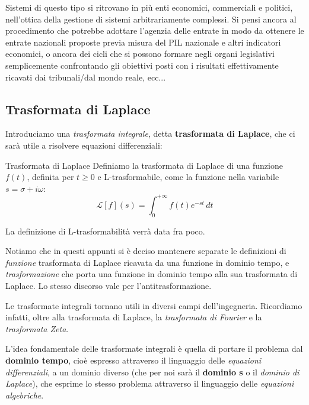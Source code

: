 \documentclass[a4paper,11pt]{article}
\begin{document}
\begin{itemize}
		Sistemi di questo tipo si ritrovano in più enti economici, commerciali e politici, nell'ottica della gestione di sistemi arbitrariamente complessi. Si pensi ancora al procedimento che potrebbe adottare l'agenzia delle entrate in modo da ottenere le entrate nazionali proposte previa misura del PIL nazionale e altri indicatori economici, o ancora dei cicli che si possono formare negli organi legislativi semplicemente confrontando gli obiettivi posti con i risultati effettivamente ricavati dai tribunali/dal mondo reale, ecc...
\end{itemize}

\subsection{Trasformata di Laplace}
Introduciamo una \textit{trasformata integrale}, detta \textbf{trasformata di Laplace}, che ci sarà utile a risolvere equazioni differenziali:
\begin{definition}{Trasformata di Laplace}
	Definiamo la trasformata di Laplace di una funzione $f(t)$, definita per $t \geq 0$ e L-trasformabile, come la funzione nella variabile $s = \sigma + i \omega$:
	$$
	\mathcal{L} [f] (s) = \int_{0}^{+\infty} f(t) e^{-st} \, dt
	$$
\end{definition}

La definizione di L-trasformabilità verrà data fra poco.

\par\smallskip

Notiamo che in questi appunti si è deciso mantenere separate le definizioni di \textit{funzione} trasformata di Laplace ricavata da una funzione in dominio tempo, e \textit{trasformazione} che porta una funzione in dominio tempo alla sua trasformata di Laplace. Lo stesso discorso vale per l'antitrasformazione.

\par\smallskip

Le trasformate integrali tornano utili in diversi campi dell'ingegneria.
Ricordiamo infatti, oltre alla trasformata di Laplace, la \textit{trasformata di Fourier} e la \textit{trasformata Zeta}.

L'idea fondamentale delle trasformate integrali è quella di portare il problema dal \textbf{dominio tempo}, cioè espresso attraverso il linguaggio delle \textit{equazioni differenziali}, a un dominio diverso (che per noi sarà il \textbf{dominio s} o il \textit{dominio di Laplace}), che esprime lo stesso problema attraverso il linguaggio delle \textit{equazioni algebriche}.
\end{document}

